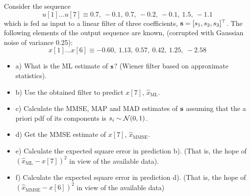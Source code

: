 \begin{prob}
\label{ProbFiltrado}

Consider the sequence
$$
u[1] \ldots u[7] \equiv 0.7,~-0.1,~0.7,~-0.2,~-0.1,~1.5,~-1.1
$$
which is fed as input to a linear filter of three coefficients, ${\mathbf s} = [s_1, s_2, s_3]^\top$. The following elements of the output sequence are known, (corrupted with Gaussian noise of variance 0.25):
$$
x[1] \ldots x[6] \equiv  -0.60,~1.13,~0.57,~0.42,~1.25,~-2.58
$$

\begin {itemize}
\item [a)] What is the ML estimate of ${\mathbf s}$? (Wiener filter based on approximate statistics).
\item [b)] Use the obtained filter to predict $x[7]$, $\hat{x}_\text{ML}$.
\item [c)] Calculate the MMSE, MAP and MAD estimates of ${\mathbf s}$ assuming that the a priori pdf of its components is $s_i \sim {\mathcal N}(0,1)$.
\item [d)] Get the MMSE estimate of $x[7]$, $\hat{x}_\text{MMSE}$.
\item [e)] Calculate the expected square error in prediction b). (That is, the hope of $ (\hat{x}_\text{ML} -x[7])^2$ in view of the available data).
\item [f)] Calculate the expected square error in prediction d). (That is, the hope of $(\hat{x}_\text{MMSE} -x[6])^2 $ in view of the available data)
\end{itemize}

\end{prob}
